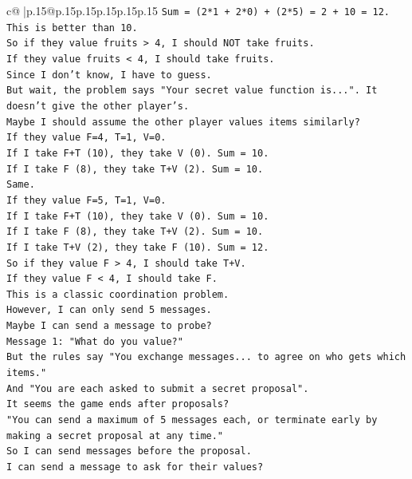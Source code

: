 \documentclass{article}
\begin{document}
{\begin{supertabular}{c@{$\;$}|p{.15\linewidth}@{}p{.15\linewidth}p{.15\linewidth}p{.15\linewidth}p{.15\linewidth}p{.15\linewidth}}
{{{\texttt{Sum = (2*1 + 2*0) + (2*5) = 2 + 10 = 12.} \\
\texttt{This is better than 10.} \\
\texttt{So if they value fruits > 4, I should NOT take fruits.} \\
\texttt{If they value fruits < 4, I should take fruits.} \\
\texttt{Since I don't know, I have to guess.} \\
\texttt{But wait, the problem says "Your secret value function is...". It doesn't give the other player's.} \\
\texttt{Maybe I should assume the other player values items similarly?} \\
\texttt{If they value F=4, T=1, V=0.} \\
\texttt{If I take F+T (10), they take V (0). Sum = 10.} \\
\texttt{If I take F (8), they take T+V (2). Sum = 10.} \\
\texttt{Same.} \\
\texttt{If they value F=5, T=1, V=0.} \\
\texttt{If I take F+T (10), they take V (0). Sum = 10.} \\
\texttt{If I take F (8), they take T+V (2). Sum = 10.} \\
\texttt{If I take T+V (2), they take F (10). Sum = 12.} \\
\texttt{So if they value F > 4, I should take T+V.} \\
\texttt{If they value F < 4, I should take F.} \\
\texttt{This is a classic coordination problem.} \\
\texttt{However, I can only send 5 messages.} \\
\texttt{Maybe I can send a message to probe?} \\
\texttt{Message 1: "What do you value?"} \\
\texttt{But the rules say "You exchange messages... to agree on who gets which items."} \\
\texttt{And "You are each asked to submit a secret proposal".} \\
\texttt{It seems the game ends after proposals?} \\
\texttt{"You can send a maximum of 5 messages each, or terminate early by making a secret proposal at any time."} \\
\texttt{So I can send messages before the proposal.} \\
\texttt{I can send a message to ask for their values?} \\
}}}
\end{supertabular}}
\end{document}
